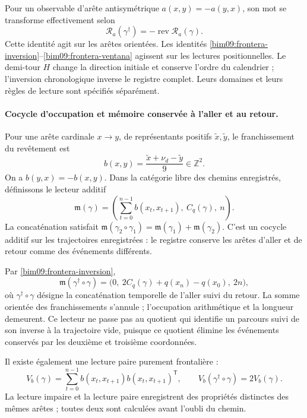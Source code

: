 Pour un observable d'arête antisymétrique $a(x,y)=-a(y,x)$, son mot
se transforme effectivement selon
\[
 \mathcal R_a(\gamma^\dagger)
 =-\operatorname{rev}\mathcal R_a(\gamma).
\]
Cette identité agit sur les arêtes orientées. Les identités
\eqref{bim09:frontera-inversion}--\eqref{bim09:frontera-ventana}
agissent sur les lectures positionnelles. Le demi-tour $H$ change la
direction initiale et conserve l'ordre du calendrier ; l'inversion
chronologique inverse le registre complet. Leurs domaines et leurs règles de
lecture sont spécifiés séparément.

\paragraph{Cocycle d'occupation et mémoire conservée à l'aller et au retour.}

Pour une arête cardinale $x\to y$, de représentants positifs
$\widetilde x,\widetilde y$, le franchissement du revêtement est
\[
 b(x,y)=\frac{\widetilde x+\nu_d-\widetilde y}{9}\in\mathbb Z^2.
\]
On a $b(y,x)=-b(x,y)$. Dans la catégorie libre des chemins
enregistrés, définissons le lecteur additif
\begin{equation}
 \mathfrak m(\gamma)=
 \left(\sum_{t=0}^{n-1}b(x_t,x_{t+1}),\ C_q(\gamma),\ n\right).
 \label{bim09:memoria-aditiva}
\end{equation}
La concaténation satisfait
$\mathfrak m(\gamma_2\circ\gamma_1)=
\mathfrak m(\gamma_1)+\mathfrak m(\gamma_2)$.
C'est un cocycle additif sur les trajectoires enregistrées : le registre conserve
les arêtes d'aller et de retour comme des événements différents.

Par \eqref{bim09:frontera-inversion},
\begin{equation}
 \mathfrak m(\gamma^\dagger\circ\gamma)=
 \bigl(0,\ 2C_q(\gamma)+q(x_n)-q(x_0),\ 2n\bigr),
 \label{bim09:memoria-retorno}
\end{equation}
où $\gamma^\dagger\circ\gamma$ désigne la concaténation temporelle
de l'aller suivi du retour. La somme orientée des franchissements s'annule ;
l'occupation arithmétique et la longueur demeurent. Ce lecteur ne
passe pas au quotient qui identifie un parcours suivi de son inverse
à la trajectoire vide, puisque ce quotient élimine les événements
conservés par les deuxième et troisième coordonnées.

Il existe également une lecture paire purement frontalière :
\[
 V_b(\gamma)=\sum_{t=0}^{n-1}
 b(x_t,x_{t+1})b(x_t,x_{t+1})^{\mathsf T},\qquad
 V_b(\gamma^\dagger\circ\gamma)=2V_b(\gamma).
\]
La lecture impaire et la lecture paire enregistrent des propriétés distinctes des
mêmes arêtes ; toutes deux sont calculées avant l'oubli du chemin.

